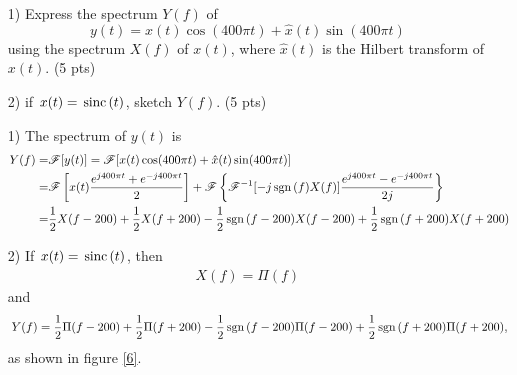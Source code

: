 \documentclass{assignment}
\begin{document}
\begin{prob}
    \begin{itemize}
        \item[1)] Express the spectrum $Y(f)$ of
        \[
            y(t)=x(t)\cos(400\pi t)+\hat{x}(t)\sin(400\pi t)
        \]
        using the spectrum $X(f)$ of $x(t)$, where $\hat{x}(t)$ is the Hilbert transform of $x(t)$. (5 pts)
        \item[2)] if $x(t)=\,\text{sinc}\,(t)$, sketch $Y(f)$. (5 pts)
    \end{itemize}
\end{prob}
\begin{sol}
    \begin{itemize}
        \item[1)] The spectrum of $y(t)$ is
        \begin{align}
            \notag Y(f)=&\mathscr{F}[y(t)]=\mathscr{F}[x(t)\cos(400\pi t)+\hat{x}(t)\sin(400\pi t)]\\
            \notag=&\mathscr{F}\left[x(t)\frac{e^{j400\pi t}+e^{-j400\pi t}}{2}\right]+\mathscr{F}\left\{\mathscr{F}^{-1}[-j\,\text{sgn}\,(f)X(f)]\frac{e^{j400\pi t}-e^{-j400\pi t}}{2j}\right\}\\
            =&\frac{1}{2}X(f-200)+\frac{1}{2}X(f+200)-\frac{1}{2}\,\text{sgn}\,(f-200)X(f-200)+\frac{1}{2}\,\text{sgn}\,(f+200)X(f+200)
        \end{align}
        \item[2)] If $x(t)=\,\text{sinc}\,(t)$, then
        \begin{align}
            X(f)=\Pi(f)
        \end{align}
        and
        \begin{align}
            Y(f)=\frac{1}{2}\Pi(f-200)+\frac{1}{2}\Pi(f+200)-\frac{1}{2}\,\text{sgn}\,(f-200)\Pi(f-200)+\frac{1}{2}\,\text{sgn}\,(f+200)\Pi(f+200),
        \end{align}
        as shown in figure \ref{6}.
        \begin{figure}[h]
            \centering

\end{figure}
\end{itemize}
\end{sol}
\end{document}
